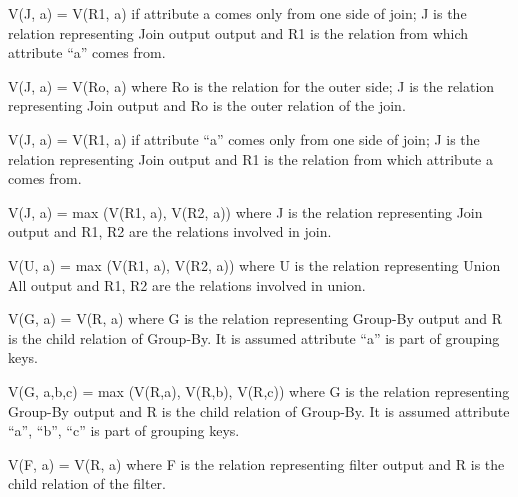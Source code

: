 \documentclass{vldb}
\newcommand{\ii}{\item}
\begin{document}
\ii V(J, a) = V(R1, a) if attribute a comes only from one side of join; J is the relation representing Join output output and R1 is the relation from which attribute “a” comes from.
\ii V(J, a) = V(Ro, a) where Ro is the relation for the outer side; J is the relation representing Join output and Ro is the outer relation of the join.
\ii V(J, a) = V(R1, a) if attribute “a” comes only from one side of join; J is the relation representing Join output and R1 is the relation from which attribute a comes from.
\ii V(J, a) = max (V(R1, a), V(R2, a)) where J is the relation representing Join output and R1, R2 are the relations involved in join.
\ii V(U, a) = max (V(R1, a), V(R2, a)) where U is the relation representing Union All output and R1, R2 are the relations involved in union.
\ii V(G, a) = V(R, a) where G is the relation representing Group-By output and R is the child relation of Group-By. It is assumed attribute “a” is part of grouping keys.
\ii V(G, a,b,c) = max (V(R,a), V(R,b), V(R,c)) where G is the relation representing Group-By output and R is the child relation of Group-By. It is assumed attribute “a”, “b”, “c” is part of grouping keys.
\ii V(F, a) = V(R, a) where F is the relation representing filter output and R is the child relation of the filter.
\end{document}
